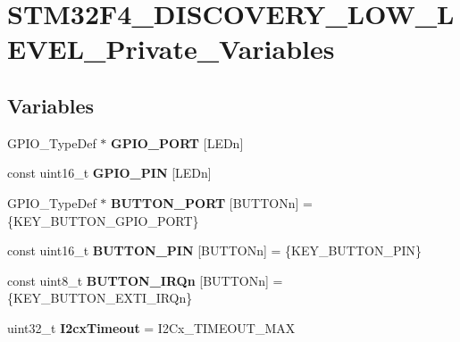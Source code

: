 \hypertarget{group__STM32F4__DISCOVERY__LOW__LEVEL__Private__Variables}{\section{S\-T\-M32\-F4\-\_\-\-D\-I\-S\-C\-O\-V\-E\-R\-Y\-\_\-\-L\-O\-W\-\_\-\-L\-E\-V\-E\-L\-\_\-\-Private\-\_\-\-Variables}
\label{group__STM32F4__DISCOVERY__LOW__LEVEL__Private__Variables}
}
\subsection*{Variables}
\begin{DoxyCompactItemize}
\item 
G\-P\-I\-O\-\_\-\-Type\-Def $\ast$ {\bfseries G\-P\-I\-O\-\_\-\-P\-O\-R\-T} \mbox{[}L\-E\-Dn\mbox{]}
\item 
const uint16\-\_\-t {\bfseries G\-P\-I\-O\-\_\-\-P\-I\-N} \mbox{[}L\-E\-Dn\mbox{]}
\item 
\hypertarget{group__STM32F4__DISCOVERY__LOW__LEVEL__Private__Variables_gad63ed42b4071e78f80f7462227da4f35}{G\-P\-I\-O\-\_\-\-Type\-Def $\ast$ {\bfseries B\-U\-T\-T\-O\-N\-\_\-\-P\-O\-R\-T} \mbox{[}B\-U\-T\-T\-O\-Nn\mbox{]} = \{K\-E\-Y\-\_\-\-B\-U\-T\-T\-O\-N\-\_\-\-G\-P\-I\-O\-\_\-\-P\-O\-R\-T\}}\label{group__STM32F4__DISCOVERY__LOW__LEVEL__Private__Variables_gad63ed42b4071e78f80f7462227da4f35}

\item 
\hypertarget{group__STM32F4__DISCOVERY__LOW__LEVEL__Private__Variables_gadf78f2d71408a01f8d30929c2d2da82b}{const uint16\-\_\-t {\bfseries B\-U\-T\-T\-O\-N\-\_\-\-P\-I\-N} \mbox{[}B\-U\-T\-T\-O\-Nn\mbox{]} = \{K\-E\-Y\-\_\-\-B\-U\-T\-T\-O\-N\-\_\-\-P\-I\-N\}}\label{group__STM32F4__DISCOVERY__LOW__LEVEL__Private__Variables_gadf78f2d71408a01f8d30929c2d2da82b}

\item 
\hypertarget{group__STM32F4__DISCOVERY__LOW__LEVEL__Private__Variables_ga13c3e27c584df9fccc4697dd535ea1cd}{const uint8\-\_\-t {\bfseries B\-U\-T\-T\-O\-N\-\_\-\-I\-R\-Qn} \mbox{[}B\-U\-T\-T\-O\-Nn\mbox{]} = \{K\-E\-Y\-\_\-\-B\-U\-T\-T\-O\-N\-\_\-\-E\-X\-T\-I\-\_\-\-I\-R\-Qn\}}\label{group__STM32F4__DISCOVERY__LOW__LEVEL__Private__Variables_ga13c3e27c584df9fccc4697dd535ea1cd}

\item 
\hypertarget{group__STM32F4__DISCOVERY__LOW__LEVEL__Private__Variables_ga80bd3f2cfbc6d3e18a1bf283c48c6d9e}{uint32\-\_\-t {\bfseries I2cx\-Timeout} = I2\-Cx\-\_\-\-T\-I\-M\-E\-O\-U\-T\-\_\-\-M\-A\-X}\label{group__STM32F4__DISCOVERY__LOW__LEVEL__Private__Variables_ga80bd3f2cfbc6d3e18a1bf283c48c6d9e}


\end{DoxyCompactItemize}
